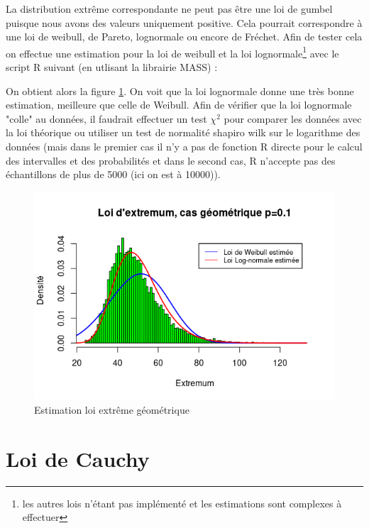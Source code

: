 \documentclass[12pt,a4paper,titlepage]{article}
\numberwithin{equation}{section}
\begin{document}
La distribution extrême correspondante ne peut pas être une loi de gumbel puisque nous avons des valeurs uniquement positive. Cela pourrait correspondre à une loi de weibull, de Pareto, lognormale ou encore de Fréchet.
Afin de tester cela on effectue une estimation pour la loi de weibull et la loi lognormale\footnote{les autres lois n'étant pas implémenté et les estimations sont complexes à effectuer} avec le script R suivant (en utlisant la librairie MASS) :



On obtient alors la figure \ref{Estimation loi extrême géométrique}. On voit que la loi lognormale donne une très bonne estimation, meilleure que celle de Weibull. Afin de vérifier que la loi lognormale "colle" au données, il faudrait effectuer un test $\chi^2$ pour comparer les données avec la loi théorique ou utiliser un test de normalité shapiro wilk sur le logarithme des données (mais dans le premier cas il n'y a pas de fonction R directe pour le calcul des intervalles et des probabilités et dans le second cas, R n'accepte pas des échantillons de plus de 5000 (ici on est à 10000)).

\begin{figure}[!h]
\begin{center}
 \includegraphics[scale=0.7]{images/RplotGeomExtrem.png} 
\end{center}
 \caption{Estimation loi extrême géométrique}
 \label{Estimation loi extrême géométrique}
\end{figure}



\newpage


\section{Loi de Cauchy}
\end{document}
